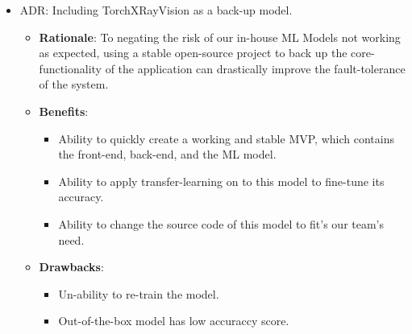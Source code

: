 \documentclass[12pt]{article}
\newcounter{adrnum} %
\begin{document}
\begin{itemize}
    \item ADR\theadrnum \label{ADR_torchxray_as_backup}: Including TorchXRayVision as a back-up model.
    
    \begin{itemize}
        \item \textbf{Rationale}: To negating the risk of our in-house ML Models not working as expected, using a stable open-source project to back up the core-functionality of the application can drastically improve the fault-tolerance of the system.
        \item \textbf{Benefits}:
        \begin{itemize}
            \item Ability to quickly create a working and stable MVP, which contains the front-end, back-end, and the ML model.
            \item Ability to apply transfer-learning on to this model to fine-tune its accuracy.
            \item Ability to change the source code of this model to fit's our team's need.
        \end{itemize}
        \item \textbf{Drawbacks}:
        \begin{itemize}
            \item Un-ability to re-train the model.
            \item Out-of-the-box model has low accuraccy score.
        \end{itemize}
    \end{itemize}
\end{itemize}
\end{document}
